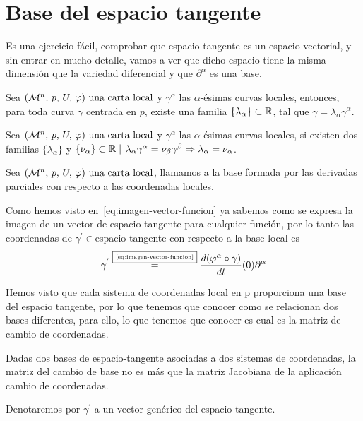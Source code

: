\section{Base del espacio tangente}\label{sec:base-espacio-tangente}

Es una ejercicio fácil, comprobar que \gls{espacio-tangente} es un espacio vectorial, y sin entrar en mucho
detalle, vamos a ver que dicho espacio tiene la misma dimensión que la variedad diferencial y que ${\partial^\alpha}$ es una base.

\begin{proposition}
  Sea $(\mathcal{M}^n,\thinspace p,\thinspace U,\thinspace \varphi)\textmd{ una carta local}$ y ${\gamma^\alpha}$ las $\alpha$-ésimas curvas locales, entonces, para toda curva $\gamma$
  centrada en $p$, existe una familia $\{\lambda_\alpha\}\subset\mathbb{R}$, tal que $\gamma=\lambda_\alpha\gamma^\alpha$.
\end{proposition}

\begin{proposition}
  Sea $(\mathcal{M}^n,\thinspace p,\thinspace U,\thinspace \varphi)\textmd{ una carta local}$ y ${\gamma^\alpha}$ las $\alpha$-ésimas curvas locales, si existen dos familias
  $\{\lambda_\alpha\}$ y $\{\nu_\alpha\}\subset\mathbb{R}\mid$
  $\lambda_\alpha\gamma^\alpha=\nu_\beta\gamma^\beta\Rightarrow\lambda_\alpha=\nu_\alpha$.
\end{proposition}

\begin{definition}
  Sea $(\mathcal{M}^n,\thinspace p,\thinspace U,\thinspace \varphi)\textmd{ una carta local}$, llamamos  a la base
  formada por las derivadas parciales con respecto a las coordenadas locales.
\end{definition}

Como hemos visto en~\ref{eq:imagen-vector-funcion} ya sabemos como se expresa la imagen de un vector de
\gls{espacio-tangente} para cualquier función, por lo tanto las coordenadas de $\gamma^{'}\in$\gls{espacio-tangente}
con respecto a la base local es
\begin{equation}\label{eq:vector-tangente-coordenadas-locales}
\gamma^{'}\overset{\fbox{\tiny \ref{eq:imagen-vector-funcion}}}{=}
\frac{d(\varphi^\alpha\circ\gamma)}{dt}(0)\partial^\alpha
\end{equation}

Hemos visto que cada sistema de coordenadas local en p proporciona una base del espacio tangente, por lo que tenemos
que conocer como se relacionan dos bases diferentes, para ello, lo que tenemos que conocer es cual es la matriz de
cambio de coordenadas.

\begin{proposition}
  Dadas dos bases de \gls{espacio-tangente} asociadas a dos sistemas de coordenadas, la matriz del cambio de base no es
  má́s que la matriz Jacobiana de la aplicación cambio de coordenadas.
\end{proposition}

\begin{notation}
  Denotaremos por $\gamma^{'}$ a un vector genérico del espacio tangente.
\end{notation}